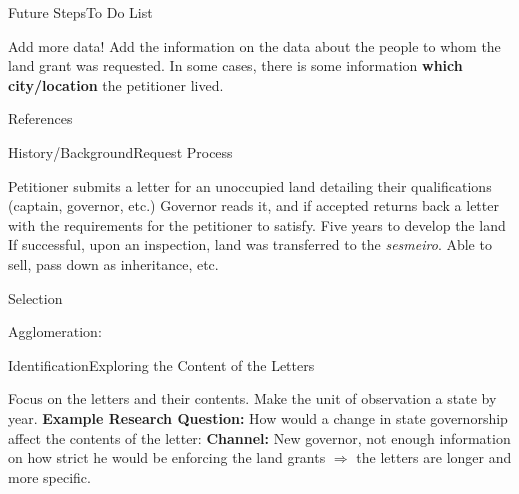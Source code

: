 \documentclass[aspectratio=1610]{beamer}
\begin{document}
\begin{frame}{Future Steps}{To Do List}
    \begin{outline}
        \1 Add more data!
        \vspace{2mm}
        \1 Add the information on the data about the people to whom the land grant was requested. 
        \vspace{2mm}
            \2 In some cases, there is some information \textbf{which city/location} the petitioner lived.
    \end{outline}
\end{frame}

\begin{frame}{References}
    \printbibliography
\end{frame}

\appendix

\begin{frame}{History/Background}{Request Process}
    \begin{outline}
        \1 Petitioner submits a letter for an unoccupied land detailing their qualifications (captain, governor, etc.)
        \vspace{1mm}
        \pause 
        \1 Governor reads it, and if accepted returns back a letter with the requirements for the petitioner to satisfy.
        \vspace{1mm}
        \pause 
        \1 Five years to develop the land
        \vspace{1mm}
        \pause 
        \1 If successful, upon an inspection, land was transferred to the \textit{sesmeiro}.
        \vspace{1mm}
        \pause 
        \1 Able to sell, pass down as inheritance, etc. 
    \end{outline}
\end{frame}

\begin{frame}{Selection}\hypertarget{selection}{}
    \begin{outline}
        \1 Agglomeration: \hyperlink{agglomeration}{}
    \end{outline}
\end{frame}

\begin{frame}{Identification}{Exploring the Content of the Letters}
    \begin{outline}
        \1 Focus on the letters and their contents. 
        \vspace{2mm}
        \1 Make the unit of observation a state by year. 
        \vspace{2mm}
        \1 \textbf{Example Research Question:} How would a change in state governorship affect the contents of the letter:
        \vspace{1mm}
            \2 \textbf{Channel:} New governor, not enough information on how strict he would be enforcing the land grants $\Rightarrow$ the letters are longer and more specific.
        \vspace{1mm}
    \end{outline}
\end{frame}
\end{document}
